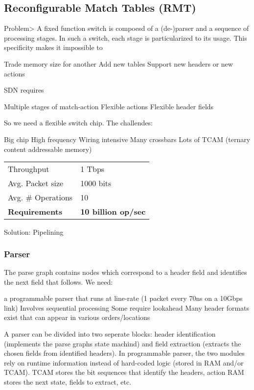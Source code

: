 \documentclass[a4paper, fontsize=8pt, landscape, DIV=1]{scrartcl}
\begin{document}
\begin{multicols*}{4}
  \subsection{Reconfigurable Match Tables (RMT)}
  Problem> A fixed function switch is compoesd of a (de-)parser and a sequence of
  processing stages. In such a switch, each stage is particularized to its usage. 
  This specificity makes it impossible to 
  \begin{outline}
   \1 Trade memory size for another
   \1 Add new tables
   \1 Support new headers or new actions
  \end{outline}

  SDN requires
  \begin{outline}
   \1 Multiple stages of match-action
   \1 Flexible actions
   \1 Flexible header fields
  \end{outline}

  So we need a flexible switch chip. The challendes:
  \begin{outline}
   \1 Big chip
   \1 High frequency
   \1 Wiring intensive
   \1 Many crossbars
   \1 Lots of TCAM (ternary content addressable memory)
  \end{outline}

  \begin{tabularx}{\columnwidth}{X l}
    Throughput & 1 Tbps \\
    Avg. Packet size & 1000 bits \\
    Avg. \# Operations & 10\\
    \textbf{Requirements} & \textbf{10 billion op/sec}
  \end{tabularx}

  Solution: Pipelining

  \subsubsection{Parser}
  The parse graph contains nodes which correspond to a header field and identifies the 
  next field that follows. We need:
  \begin{outline}
   \1 a programmable parser that runs at line-rate (1 packet every 70ns on a 10Gbps link)
   \1 Involves sequential processing
   \1 Some require lookahead
   \1 Many header formats exist that can appear in various orders/locations
  \end{outline}

  A parser can be divided into two seperate blocks: header identification (implements
  the parse graphs state machind) and field extraction (extracts the chosen fields from
  identified headers). In programmable parser, the two modules rely on runtime information instead
  of hard-coded logic (stored in RAM and/or TCAM). TCAM stores the bit sequences that identify
  the headers, action RAM stores the next state, fields to extract, etc. 


\end{multicols*}
\end{document}
